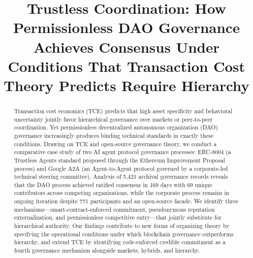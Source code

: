 \documentclass[conference]{IEEEtran}
\begin{document}
\title{Trustless Coordination: How Permissionless DAO Governance Achieves
       Consensus Under Conditions That Transaction Cost Theory Predicts
       Require Hierarchy}

\author{
}

\maketitle

\begin{abstract}
Transaction cost economics (TCE) predicts that high asset specificity and
behavioral uncertainty jointly favor hierarchical governance over markets or
peer-to-peer coordination. Yet permissionless decentralized autonomous
organization (DAO) governance increasingly produces binding technical standards
in exactly these conditions. Drawing on TCE and open-source governance theory,
we conduct a comparative case study of two AI agent protocol governance
processes: ERC-8004 (a Trustless Agents standard proposed through the Ethereum
Improvement Proposal process) and Google A2A (an Agent-to-Agent protocol
governed by a corporate-led technical steering committee). Analysis of 5,421
archival governance records reveals that the DAO process achieved ratified
consensus in 169 days with 69 unique contributors across competing organizations, while
the corporate process remains in ongoing iteration despite 771 participants and
an open-source facade. We identify three mechanisms---smart-contract-enforced
commitment, pseudonymous reputation externalization, and permissionless
competitive entry---that jointly substitute for hierarchical authority. Our
findings contribute to new forms of organizing theory by specifying the
operational conditions under which blockchain governance outperforms hierarchy,
and extend TCE by identifying code-enforced credible commitment as a
fourth governance mechanism alongside markets, hybrids, and hierarchy.
\end{abstract}
\end{document}
